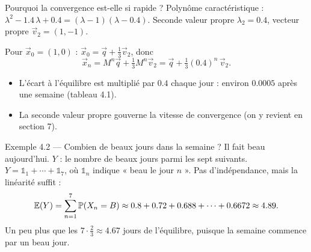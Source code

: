 \begin{frame}{Pourquoi la convergence est-elle si rapide ?}
  \small Polynôme caractéristique :
  $\lambda^2-\num{1.4}\,\lambda+\num{0.4} = (\lambda-1)(\lambda-\num{0.4})$.
  Seconde valeur propre $\lambda_2=\num{0.4}$, vecteur propre
  $\vec v_2=(1,-1)$.
  \vspace{4pt}

  Pour $\vec x_0=(1,0)$ : $\vec x_0=\vec q+\tfrac13\vec v_2$, donc
  \[
    \vec x_n = M^n\vec q+\tfrac13M^n\vec v_2
    = \vec q+\tfrac13(\num{0.4})^n\,\vec v_2 .
  \]
  \begin{itemize}
    \item L'écart à l'équilibre est multiplié par $\num{0.4}$ chaque
      jour : environ $\num{0.0005}$ après une semaine (tableau 4.1).
    \item La seconde valeur propre gouverne la vitesse de convergence
      (on y revient en section 7).
  \end{itemize}
\end{frame}

\begin{frame}{Exemple 4.2 --- Combien de beaux jours dans la semaine ?}
  \small Il fait beau aujourd'hui. $Y$ : le nombre de beaux jours parmi
  les sept suivants. $Y=\mathbb 1_1+\cdots+\mathbb 1_7$, où
  $\mathbb 1_n$ indique « beau le jour $n$ ». Pas d'indépendance, mais la
  linéarité suffit :
  \[
    \mathbb{E}\mathopen{}\left(Y\right)\mathclose{} = \sum_{n=1}^7\mathbb{P}\mathopen{}\left(X_n=B\right)\mathclose{}
    \approx \num{0.8}+\num{0.72}+\num{0.688}+\cdots+\num{0.6672}
    \approx \num{4.89}.
  \]
  Un peu plus que les $7\cdot\tfrac23\approx\num{4.67}$ jours de
  l'équilibre, puisque la semaine commence par un beau jour.
\end{frame}

